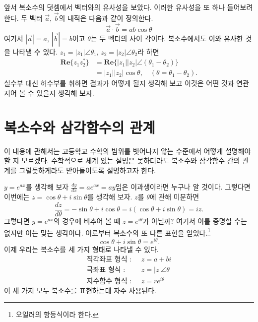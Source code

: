 \documentclass[a4paper, nobookmarks, subfigure, adjustmath, amsmath]{oblivoir}
\begin{document}
앞서 복소수의 덧셈에서 벡터와의 유사성을 보았다. 이러한 유사성을 또 하나 들어보려 한다. 두 벡터 $\vec{a}$, $\vec{b}$의 내적은 다음과 같이 정의한다.
\begin{equation}
\vec{a} \cdot \vec{b} = ab \cos\theta
\end{equation}
여기서 $|\vec{a}| = a$, $|\vec{b}| = b$이고 $\theta$는 두 벡터의 사이 각이다. 복소수에서도 이와 유사한 것을 나타낼 수 있다. $z_1 = |z_1| \angle \theta_1$, $z_2 = |z_2| \angle \theta_2$라 하면
\begin{align}
\mathbf{Re}\{z_1 z_2^{\ast}\} &= \mathbf{Re}\{ |z_1||z_2| \angle (\theta_1 - \theta_2)\}\nonumber \\
&= |z_1||z_2| \cos \theta, \quad (\theta = \theta_1 - \theta_2).
\end{align}
실수부 대신 허수부를 취하면 결과가 어떻게 될지 생각해 보고 이것은 어떤 것과 연관 지어 볼 수 있을지 생각해 보자.


\section{복소수와 삼각함수의 관계}
이 내용에 관해서는 고등학교 수학의 범위를 벗어나지 않는 수준에서 어떻게 설명해야 할 지 모르겠다. 수학적으로 체계 있는 설명은 못하더라도 복소수와 삼각함수 간의 관계를 그럴듯하게라도 받아들이도록 설명하고자 한다.

$y = e^{ax}$를 생각해 보자 $\frac{dy}{dx} = a e^{ax} = ay$임은 이과생이라면 누구나 알 것이다. 그렇다면 이번에는 $z = \cos\theta + i\sin\theta$를 생각해 보자. $z$를 $\theta$에 관해 미분하면
\begin{equation}
\frac{dz}{d\theta} = -\sin\theta + i\cos\theta = i(\cos\theta + i\sin\theta) = iz.
\end{equation}
그렇다면 $y = e^{ax}$의 경우에 비추어 볼 때 $z = e^{i\theta}$가 아닐까? 여기서 이를 증명할 수는 없지만 이는 맞는 생각이다. 이로부터 복소수의 또 다른 표현을 얻었다.\footnote{오일러의 항등식이라 한다.}
\begin{equation} \label{eqEuler}
\cos\theta + i\sin\theta = e^{i\theta}.
\end{equation}
이제 우리는 복소수를 세 가지 형태로 나타낼 수 있다.
\begin{align}
\textrm{직각좌표 형식 : }&\; z = a+bi \nonumber \\
\textrm{극좌표 형식 : }&\; z = |z| \angle\theta \nonumber \\
\textrm{지수함수 형식 : }&\; z = re^{i\theta} \nonumber
\end{align}
이 세 가지 모두 복소수를 표현하는데 자주 사용된다.
\end{document}

